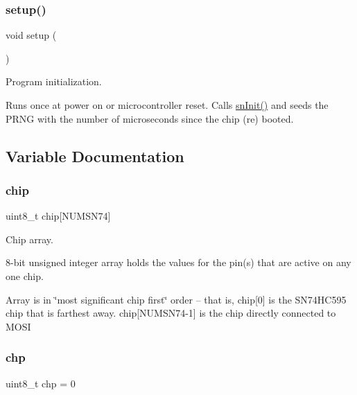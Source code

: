 \subsubsection{\texorpdfstring{setup()}{setup()}}
{\footnotesize\ttfamily void setup (\begin{DoxyParamCaption}{ }\end{DoxyParamCaption})}



Program initialization. 

Runs once at power on or microcontroller reset. Calls \hyperlink{tinysn74_8c_a75d55e672f3f4dd06cd0c73479f64ade}{sn\+Init()} and seeds the P\+R\+NG with the number of microseconds since the chip (re) booted. 

\subsection{Variable Documentation}
\mbox{\label{SN74__RandomBlink_8ino_a4bc5cfe94d996891a734c6c645f44e45}} 
\subsubsection{\texorpdfstring{chip}{chip}}
{\footnotesize\ttfamily uint8\+\_\+t chip\mbox{[}N\+U\+M\+S\+N74\mbox{]}}



Chip array. 

8-\/bit unsigned integer array holds the values for the pin(s) that are active on any one chip.

Array is in \char`\"{}most significant chip first\char`\"{} order -- that is, chip\mbox{[}0\mbox{]} is the S\+N74\+H\+C595 chip that is farthest away. chip\mbox{[}N\+U\+M\+S\+N74-\/1\mbox{]} is the chip directly connected to M\+O\+SI \mbox{\label{SN74__RandomBlink_8ino_aab45faad5b835d77a869fca4747ab75d}} 
\subsubsection{\texorpdfstring{chp}{chp}}
{\footnotesize\ttfamily uint8\+\_\+t chp = 0}



